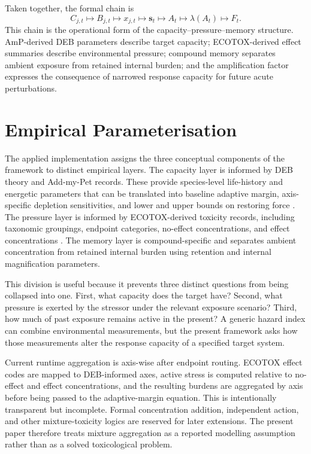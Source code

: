 Taken together, the formal chain is
\begin{equation}
  C_{j,t}\mapsto B_{j,t}\mapsto x_{j,t}
  \mapsto \mathbf{s}_{t}
  \mapsto A_t
  \mapsto \lambda(A_t)
  \mapsto F_t.
  \label{eq:memory_chain}
\end{equation}
This chain is the operational form of the capacity--pressure--memory structure. AmP-derived DEB parameters describe target capacity; ECOTOX-derived effect summaries describe environmental pressure; compound memory separates ambient exposure from retained internal burden; and the amplification factor expresses the consequence of narrowed response capacity for future acute perturbations.

\section{Empirical Parameterisation}
\label{sec:empirical_parameterisation}

The applied implementation assigns the three conceptual components of the framework to distinct empirical layers. The capacity layer is informed by DEB theory and Add-my-Pet records. These provide species-level life-history and energetic parameters that can be translated into baseline adaptive margin, axis-specific depletion sensitivities, and lower and upper bounds on restoring force \citep{kooijman2010deb,marques2018amp}. The pressure layer is informed by ECOTOX-derived toxicity records, including taxonomic groupings, endpoint categories, no-effect concentrations, and effect concentrations \citep{olker2022ecotox}. The memory layer is compound-specific and separates ambient concentration from retained internal burden using retention and internal magnification parameters.

This division is useful because it prevents three distinct questions from being collapsed into one. First, what capacity does the target have? Second, what pressure is exerted by the stressor under the relevant exposure scenario? Third, how much of past exposure remains active in the present? A generic hazard index can combine environmental measurements, but the present framework asks how those measurements alter the response capacity of a specified target system.

Current runtime aggregation is axis-wise after endpoint routing. ECOTOX effect codes are mapped to DEB-informed axes, active stress is computed relative to no-effect and effect concentrations, and the resulting burdens are aggregated by axis before being passed to the adaptive-margin equation. This is intentionally transparent but incomplete. Formal concentration addition, independent action, and other mixture-toxicity logics are reserved for later extensions. The present paper therefore treats mixture aggregation as a reported modelling assumption rather than as a solved toxicological problem.

